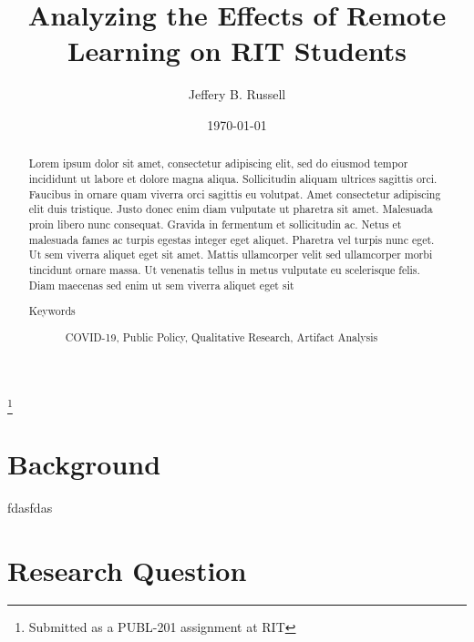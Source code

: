 \documentclass[12pt,
 reprint,
nofootinbib,
 amsmath,amssymb,
 aps,
floatfix,
]{revtex4-2}
\begin{document}

\title{Analyzing the Effects of Remote Learning on RIT Students}
\thanks{Submitted as a PUBL-201 assignment at RIT}%

\author{Jeffery B. Russell}
%

\date{\today}%




\begin{abstract}

    Lorem ipsum dolor sit amet, consectetur adipiscing elit, sed do eiusmod tempor incididunt ut labore et dolore magna aliqua. Sollicitudin aliquam ultrices sagittis orci. Faucibus in ornare quam viverra orci sagittis eu volutpat. Amet consectetur adipiscing elit duis tristique. Justo donec enim diam vulputate ut pharetra sit amet. Malesuada proin libero nunc consequat. Gravida in fermentum et sollicitudin ac. Netus et malesuada fames ac turpis egestas integer eget aliquet. Pharetra vel turpis nunc eget. Ut sem viverra aliquet eget sit amet. Mattis ullamcorper velit sed ullamcorper morbi tincidunt ornare massa. Ut venenatis tellus in metus vulputate eu scelerisque felis. Diam maecenas sed enim ut sem viverra aliquet eget sit

\begin{description}
\item[Keywords]
COVID-19, Public Policy, Qualitative Research, Artifact Analysis
\end{description}

\end{abstract}
\maketitle





\section{Background}

fdasfdas

\section{Research Question}
\end{document}
